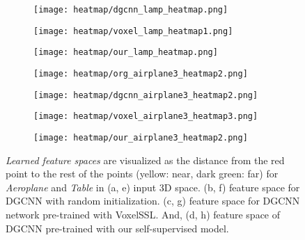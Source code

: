 \documentclass{article}
\begin{document}
\begin{figure}[tbp]
\begin{subfigure}{.24\textwidth}
		\centering
		\texttt{[image: heatmap/dgcnn\_lamp\_heatmap.png]}
		\caption{}
		\label{fig:sub10}
    \end{subfigure}\begin{subfigure}{.24\textwidth}
		\centering
		\texttt{[image: heatmap/voxel\_lamp\_heatmap1.png]}
		\caption{}
		\label{fig:sub11}
	\end{subfigure}\begin{subfigure}{.24\textwidth}
		\centering
		\texttt{[image: heatmap/our\_lamp\_heatmap.png]}
		\caption{}
		\label{fig:sub12}
	\end{subfigure}
	\begin{subfigure}{.24\textwidth}
		\centering
		\texttt{[image: heatmap/org\_airplane3\_heatmap2.png]}
		\caption{}
		\label{fig:sub13}
    \end{subfigure}\begin{subfigure}{.24\textwidth}
		\centering
		\texttt{[image: heatmap/dgcnn\_airplane3\_heatmap2.png]}
		\caption{}
		\label{fig:sub14}
    \end{subfigure}\begin{subfigure}{.24\textwidth}
		\centering
		\texttt{[image: heatmap/voxel\_airplane3\_heatmap3.png]}
		\caption{}
		\label{fig:sub15}
	\end{subfigure}\begin{subfigure}{.24\textwidth}
		\centering
		\texttt{[image: heatmap/our\_airplane3\_heatmap2.png]}
		\caption{}
		\label{fig:sub16}
    \end{subfigure}
\fi
	\caption{\emph{Learned feature spaces} are visualized as the distance from the red point to the rest of the points (yellow: near, dark green: far) for \emph{Aeroplane} and \emph{Table} in (a, e) input 3D space. (b, f) feature space for DGCNN with random initialization. (c, g) feature space for DGCNN network pre-trained with VoxelSSL. And, (d, h) feature space of DGCNN pre-trained with our self-supervised model.}
	\label{fig:heatmap}
	\vspace{-1.5em}
\end{figure}
\end{document}
